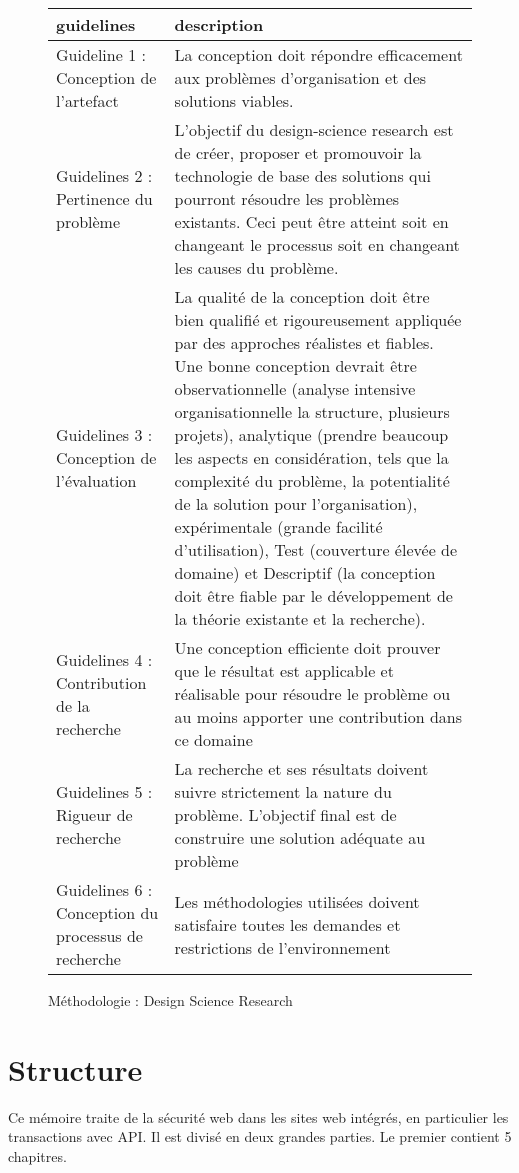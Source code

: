 \begin{figure}[]
\centering
\caption{Méthodologie : Design Science Research}
\begin{tabular}{|K|L|}
\hline
  guidelines & description  \\ \hline
 Guideline 1 : Conception de l’artefact &  La conception doit répondre efficacement aux problèmes d’organisation et des solutions viables. \\ \hline
 Guidelines 2 : Pertinence du problème &  L’objectif du design-science research est de créer, proposer et promouvoir la technologie de base des solutions qui pourront résoudre les problèmes existants. Ceci peut être atteint soit en changeant le processus soit en changeant les causes du problème. \\ \hline
 Guidelines 3 : Conception de l'évaluation & La qualité de la conception doit être bien qualifié et rigoureusement appliquée par des approches réalistes et fiables. Une bonne conception devrait être observationnelle (analyse intensive organisationnelle la structure, plusieurs projets), analytique (prendre beaucoup les aspects en considération, tels que la complexité du problème, la potentialité de la solution pour l’organisation), expérimentale (grande facilité d’utilisation), Test (couverture élevée de domaine) et Descriptif (la conception doit être fiable par le développement de la théorie existante et la recherche).  \\ \hline
 Guidelines 4 : Contribution de la recherche &  Une conception efficiente doit prouver que le résultat est applicable et réalisable pour résoudre le problème ou au moins apporter une contribution dans ce domaine \\ \hline
 Guidelines 5 : Rigueur de recherche  & La recherche et ses résultats doivent suivre strictement la nature du problème. L’objectif final est de construire une solution adéquate au problème  \\ \hline
 Guidelines 6 : Conception du processus de recherche &  Les méthodologies utilisées doivent satisfaire toutes les demandes et restrictions de l’environnement \\ \hline
\end{tabular}
\end{figure}

\section{Structure}
Ce mémoire traite de la sécurité web dans les sites web intégrés, en particulier les transactions avec API. Il est divisé en deux grandes parties. Le premier contient 5 chapitres.

